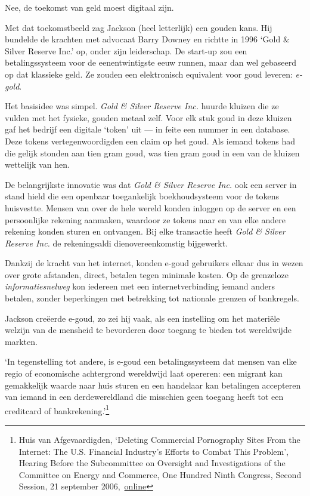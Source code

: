 \documentclass[smalldemyvopaper,11pt,twoside,onecolumn,openright,extrafontsizes,hidelinks]{memoir}
\begin{document}
Nee, de toekomst van geld moest digitaal zijn.

Met dat toekomstbeeld zag Jackson (heel letterlijk) een gouden kans. Hij
bundelde de krachten met advocaat Barry Downey en richtte in 1996 `Gold
\& Silver Reserve Inc.' op, onder zijn leiderschap. De start-up zou een
betalingssysteem voor de eenentwintigste eeuw runnen, maar dan wel
gebaseerd op dat klassieke geld. Ze zouden een elektronisch equivalent
voor goud leveren: \emph{e-gold}.

Het basisidee was simpel. \emph{Gold \& Silver Reserve Inc.} huurde
kluizen die ze vulden met het fysieke, gouden metaal zelf. Voor elk stuk
goud in deze kluizen gaf het bedrijf een digitale `token' uit --- in
feite een nummer in een database. Deze tokens vertegenwoordigden een
claim op het goud. Als iemand tokens had die gelijk stonden aan tien
gram goud, was tien gram goud in een van de kluizen wettelijk van hen.

De belangrijkste innovatie was dat \emph{Gold \& Silver Reserve Inc.}
ook een server in stand hield die een openbaar toegankelijk
boekhoudsysteem voor de tokens huisvestte. Mensen van over de hele
wereld konden inloggen op de server en een persoonlijke rekening
aanmaken, waardoor ze tokens naar en van elke andere rekening konden
sturen en ontvangen. Bij elke transactie heeft \emph{Gold \& Silver
Reserve Inc.} de rekeningsaldi dienovereenkomstig bijgewerkt.

Dankzij de kracht van het internet, konden e-goud gebruikers elkaar dus
in wezen over grote afstanden, direct, betalen tegen minimale kosten. Op
de grenzeloze \emph{informatiesnelweg} kon iedereen met een
internetverbinding iemand anders betalen, zonder beperkingen met
betrekking tot nationale grenzen of bankregels.

Jackson creëerde e-goud, zo zei hij vaak, als een instelling om het
materiële welzijn van de mensheid te bevorderen door toegang te bieden
tot wereldwijde markten.

`In tegenstelling tot andere, is e-goud een betalingssysteem dat mensen
van elke regio of economische achtergrond wereldwijd laat opereren: een
migrant kan gemakkelijk waarde naar huis sturen en een handelaar kan
betalingen accepteren van iemand in een derdewereldland die misschien
geen toegang heeft tot een creditcard of bankrekening.'\footnote{Huis
  van Afgevaardigden, `Deleting Commercial Pornography Sites From the
  Internet: The U.S. Financial Industry's Efforts to Combat This
  Problem', Hearing Before the Subcommittee on Oversight and
  Investigations of the Committee on Energy and Commerce, One Hundred
  Ninth Congress, Second Session, 21 september
  2006,~\href{https://www.govinfo.gov/content/pkg/CHRG-109hhrg31467/html/CHRG-109hhrg31467.htm}{online}}
\end{document}
